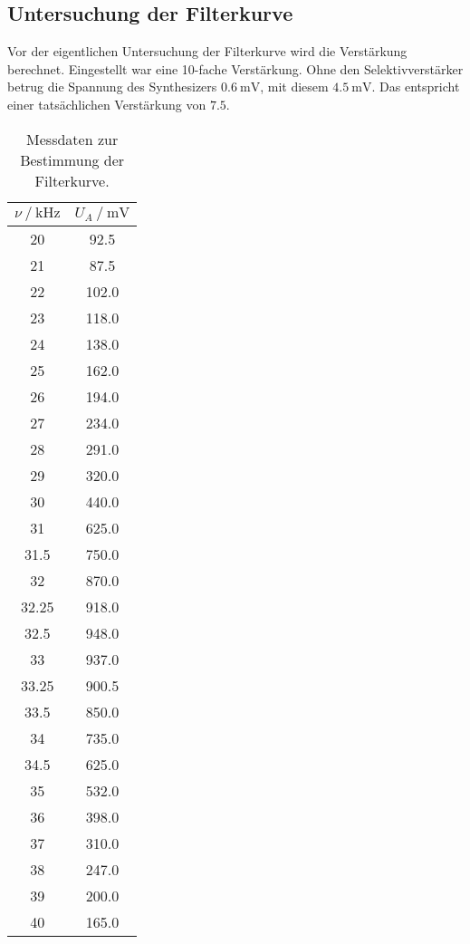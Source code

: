 \subsection{Untersuchung der Filterkurve}

Vor der eigentlichen Untersuchung der Filterkurve wird die Verstärkung berechnet.
Eingestellt war eine 10-fache Verstärkung.
Ohne den Selektivverstärker betrug die Spannung des Synthesizers $\SI{0.6}{\milli\volt}$,
mit diesem $\SI{4.5}{\milli\volt}$.
Das entspricht einer tatsächlichen Verstärkung von $\num{7.5}$.

\begin{table}
  \centering
  \caption{Messdaten zur Bestimmung der Filterkurve.}
  \label{tab:filterkurve}
  \begin{tabular}{S[table-format=2.2] S[table-format=3.1]}
  \toprule
  $\nu \mathbin{/} \si{\kilo\hertz}$ &
  $U_A \mathbin{/} \si{\milli\volt}$ \\
  \midrule
  20    & 92.5  \\
  21    & 87.5  \\
  22    & 102.0 \\
  23    & 118.0 \\
  24    & 138.0 \\
  25    & 162.0 \\
  26    & 194.0 \\
  27    & 234.0 \\
  28    & 291.0 \\
  29    & 320.0 \\
  30    & 440.0 \\
  31    & 625.0 \\
  31.5  & 750.0 \\
  32    & 870.0 \\
  32.25 & 918.0 \\
  32.5  & 948.0 \\
  33    & 937.0 \\
  33.25 & 900.5 \\
  33.5  & 850.0 \\
  34    & 735.0 \\
  34.5  & 625.0 \\
  35    & 532.0 \\
  36    & 398.0 \\
  37    & 310.0 \\
  38    & 247.0 \\
  39    & 200.0 \\
  40    & 165.0 \\
  \bottomrule
  \end{tabular}
\end{table}

